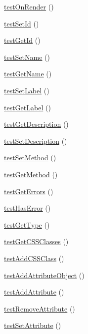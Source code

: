 \begin{DoxyCompactItemize}
\item 
\hyperlink{class_element_test_a4e08951cd939e547553c08ee5290ac1f}{testOnRender} ()
\item 
\hyperlink{class_element_test_ab3dcacda3661269b9eaf705fd084f986}{testSetId} ()
\item 
\hyperlink{class_element_test_a9231e9c3534abf04eb0c88ad68084882}{testGetId} ()
\item 
\hyperlink{class_element_test_a4cd685f2226d97a555ffda557a9d1f0d}{testSetName} ()
\item 
\hyperlink{class_element_test_a8582a7bb093ec85856a19e1c1b7cb983}{testGetName} ()
\item 
\hyperlink{class_element_test_ac0b97eef14e1d3c09a7127674fae02a2}{testSetLabel} ()
\item 
\hyperlink{class_element_test_a55e565b9c7813d8c3e26162ca0498ba1}{testGetLabel} ()
\item 
\hyperlink{class_element_test_a3790876f52cb2ba5294a55a3742b513b}{testGetDescription} ()
\item 
\hyperlink{class_element_test_aa4a15c34620107dd431e86ad70441452}{testSetDescription} ()
\item 
\hyperlink{class_element_test_a555789228c0bf03172e990bcc78d07b5}{testSetMethod} ()
\item 
\hyperlink{class_element_test_a4a0b2f826196a62840fae918ee0c6970}{testGetMethod} ()
\item 
\hyperlink{class_element_test_ab70a1761fe544b7a5b67bfd7b582b3b6}{testGetErrors} ()
\item 
\hyperlink{class_element_test_a0dfd9f7c9457ea0bd42438ad7c49f0ff}{testHasError} ()
\item 
\hyperlink{class_element_test_afcd208ff3eaa905d4ba0a7e8957bc782}{testGetType} ()
\item 
\hyperlink{class_element_test_aeb29d280844b044338e05b20a707ca98}{testGetCSSClasses} ()
\item 
\hyperlink{class_element_test_a18b0e22d475b12dc3f9291c62eb121b3}{testAddCSSClass} ()
\item 
\hyperlink{class_element_test_ab2c2e68c0f60c713d68e826339ba7901}{testAddAttributeObject} ()
\item 
\hyperlink{class_element_test_ab4dde936a604e1a8a6883db5c6c995d7}{testAddAttribute} ()
\item 
\hyperlink{class_element_test_a89c6d6773794f968de1ff4e0f4cc4d1c}{testRemoveAttribute} ()
\item 
\hyperlink{class_element_test_a3e0f9ad1fc54e41c11bc5adeec46acc9}{testSetAttribute} ()

\end{DoxyCompactItemize}
